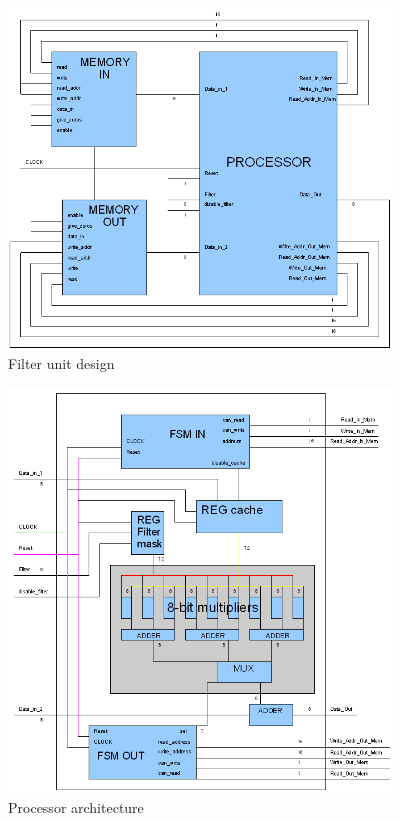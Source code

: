 \documentclass[11pt,a4paper]{article}
\begin{document}
\begin{figure}[h]
	\centering
		\includegraphics[width=4in]{./processador.PNG}
	\caption{Filter unit design}	\label{fig:proc}
\end{figure}

\begin{figure}[h]
	\centering
		\includegraphics[width=4in]{./insideproc.PNG}
	\caption{Processor architecture}	\label{fig:procdetail}
\end{figure}
\end{document}
